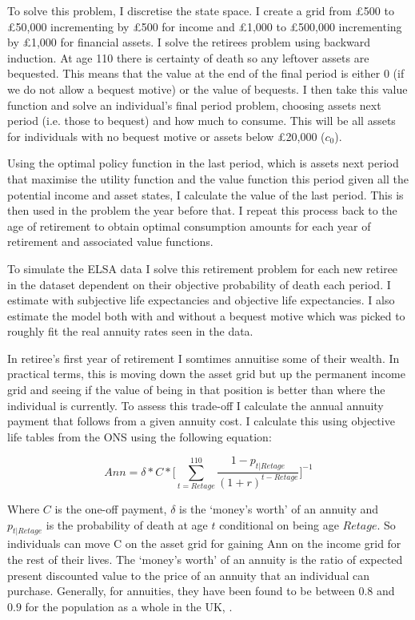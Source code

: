 \documentclass[12pt]{article}
\begin{document}
To solve this problem, I discretise the state space. I create a grid from £500
to £50,000 incrementing by £500 for income and £1,000 to £500,000 incrementing by
£1,000 for financial assets. I solve the retirees problem using backward
induction. At age 110 there is certainty of death so any leftover assets are
bequested. This means that the value at the end of the final period is either 0
(if we do not allow a bequest motive) or the value of bequests. I then take this
value function and solve an individual's final period problem, choosing assets
next period (i.e. those to bequest) and how much to consume. This will be all
assets for individuals with no bequest motive or assets below £20,000 ($c_{0}$).

Using the optimal policy function in the last period, which is assets next
period that maximise the utility function and the value function this period
given all the potential income and asset states, I calculate the value of the
last period. This is then used in the problem the year before that. I repeat
this process back to the age of retirement to obtain optimal consumption amounts
for each year of retirement and associated value functions.

To simulate the ELSA data I solve this retirement problem for each new retiree
in the dataset dependent on their objective probability of death each period. I
estimate with subjective life expectancies and objective life expectancies. I
also estimate the model both with and without a bequest motive which was picked
to roughly fit the real annuity rates seen in the data.

In retiree's first year of retirement I somtimes annuitise some of their wealth.
In practical terms, this is moving down the asset grid but up the permanent
income grid and seeing if the value of being in that position is better than
where the individual is currently. To assess this trade-off I calculate the
annual annuity payment that follows from a given annuity cost. I calculate this
using objective life tables from the ONS using the following equation:

\begin{equation*}
    Ann = \delta * C * \biggl[\sum_{t = Retage}^{110}\frac{1 - p_{t|Retage}}{(1 + r)^{t - Retage}}\biggr]^{-1}
\end{equation*}

Where $C$ is the one-off payment, $\delta$ is the `money's worth' of an annuity
and $p_{t|Retage}$ is the probability of death at age $t$ conditional on being
age $Retage$. So individuals can move C on the asset grid for gaining Ann on the
income grid for the rest of their lives. The `money's worth' of an annuity is
the ratio of expected present discounted value to the price of an annuity that
an individual can purchase. Generally, for annuities, they have been found to be
between $0.8$ and $0.9$ for the population as a whole in the UK,
\cite{finkelstein_porteba_2002} \cite{finkelstein_porteba_2004}. 
\end{document}

